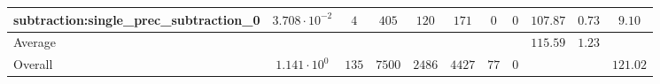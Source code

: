 \begin{tabular}{|l|c|c|c|c|c|c|c|c|c|c|}
subtraction:single\_prec\_subtraction\_0         & $ 3.708 \cdot 10^{-2} $ & $ 4      $ & $ 405  $ & $ 120  $ & $ 171   $ & $ 0  $ & $ 0 $ & $ 107.87      $ & $ 0.73    $ & $ 9.10    $ \\
\hline
Average                                          & $                     $ & $        $ & $      $ & $      $ & $       $ & $    $ & $   $ & $ 115.59      $ & $ 1.23    $ & $         $ \\
\hline
Overall                                          & $ 1.141 \cdot 10^{0}  $ & $ 135    $ & $ 7500 $ & $ 2486 $ & $ 4427  $ & $ 77 $ & $ 0 $ & $             $ & $         $ & $ 121.02  $ \\
\hline
\end{tabular}
